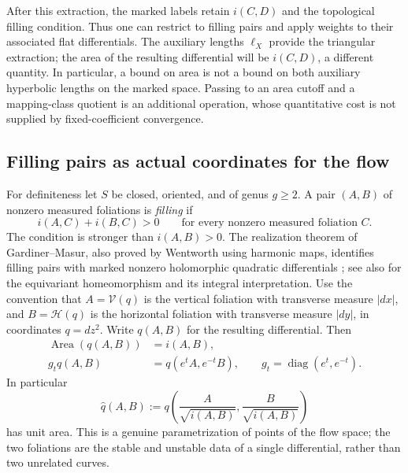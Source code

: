 \documentclass[11pt,a4paper]{article}
\numberwithin{equation}{section}
\theoremstyle{definition}
\theoremstyle{remark}
\begin{document}
After this extraction, the marked labels retain $i(C,D)$ and the
topological filling condition.  Thus one can restrict to filling
pairs and apply weights to their associated flat differentials.
The auxiliary lengths $\ell_X$ provide the triangular extraction;
the area of the resulting differential will be $i(C,D)$, a different
quantity.  In particular, a bound on area is not a bound on both
auxiliary hyperbolic lengths on the marked space.  Passing to an
area cutoff and a mapping-class quotient is an additional operation,
whose quantitative cost is not supplied by fixed-coefficient
convergence.


\subsection{Filling pairs as actual coordinates for the flow}
\label{subsec:pairgeometry}

For definiteness let $S$ be closed, oriented, and of genus $g\geq2$.
A pair $(A,B)$ of nonzero measured foliations is \emph{filling} if
\[
 i(A,C)+i(B,C)>0\qquad\text{for every nonzero measured foliation }C.
\]
The condition is stronger than $i(A,B)>0$.  The realization theorem of
Gardiner--Masur, also proved by Wentworth using harmonic maps, identifies
filling pairs with marked nonzero holomorphic quadratic differentials
\cite[Theorem~1.6 and Corollary~1.7]{WentworthGardiner}; see also
\cite[Theorem~1.6]{AranaHerreraSquare2020} for the equivariant
homeomorphism and its integral interpretation.
Use the convention that $A=\mathcal V(q)$ is the vertical foliation
with transverse measure $|dx|$, and $B=\mathcal H(q)$ is the horizontal
foliation with transverse measure $|dy|$, in coordinates $q=dz^2$.
Write $q(A,B)$ for the resulting differential.  Then
\begin{align}
 \operatorname{Area}(q(A,B))&=i(A,B),\\
 g_tq(A,B)&=q(e^tA,e^{-t}B),
 \qquad g_t=\operatorname{diag}(e^t,e^{-t}).
 \label{eq:pairgeometryflow}
\end{align}
In particular
\[
 \widehat q(A,B):=
 q\left(\frac{A}{\sqrt{i(A,B)}},
         \frac{B}{\sqrt{i(A,B)}}\right)
\]
has unit area.  This is a genuine parametrization of points of the
flow space; the two foliations are the stable and unstable data of a
single differential, rather than two unrelated curves.
\end{document}
